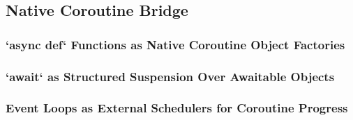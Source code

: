 \subsection{Native Coroutine Bridge}
\subsubsection{`async def` Functions as Native Coroutine Object Factories}
\subsubsection{`await` as Structured Suspension Over Awaitable Objects}
\subsubsection{Event Loops as External Schedulers for Coroutine Progress}
